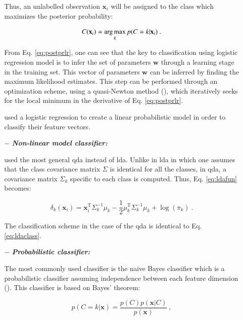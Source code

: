 \begin{enumerate}[leftmargin=*]
Thus, an unlabelled observation $\mathbf{x}_i$ will be assigned to the class which maximizes the posterior probability:

\begin{equation}
	C(\mathbf{x}_i) = \operatorname*{arg\,max}_k p(C=k|\mathbf{x}_i) \ .
	\label{eq:posprobreg}
\end{equation}

From Eq. \eqref{eq:postprlr}, one can see that the key to classification using logistic regression model is to infer the set of parameters $\mathbf{w}$ through a learning stage in the training set. This vector of parameters $\mathbf{w}$ can be inferred by finding the maximum likelihood estimates. This step can be performed through an optimization scheme, using a quasi-Newton method (\cite{Byrd1995}), which iteratively seeks for the local minimum in the derivative of Eq. \eqref{eq:postprlr}.

\cite{Kelm2007,Puech2009} used a logistic regression to create a linear probabilistic model in order to classify their feature vectors.

\item[$-$] \textbf{\textit{Non-linear model classifier:}} 

\cite{Viswanath2012} used the most general \acf{qda} instead of \ac{lda}. Unlike in \ac{lda} in which one assumes that the class covariance matrix $\Sigma$ is identical for all the classes, in \ac{qda}, a covariance matrix $\Sigma_k$ specific to each class is computed. Thus, Eq. \eqref{eq:ldafun} becomes:

\begin{equation}
	\delta_{k}(\mathbf{x}_i) = \mathbf{x}_i^{\text{T}} \Sigma_{k}^{-1} \mu_k - \frac{1}{2} \mu_{k}^{\text{T}} \Sigma_{k}^{-1} \mu_k + \log (\pi_k) \ .
	\label{eq:qdafun}
\end{equation}

The classification scheme in the case of the \ac{qda} is identical to Eq. \eqref{eq:ldaclass}.

\item[$-$] \textbf{\textit{Probabilistic classifier:}}

The most commonly used classifier is the naive Bayes classifier which is a probabilistic classifier assuming independence between each feature dimension (\cite{Rish2001}). This classifier is based on Bayes' theorem:

\begin{equation}
	p(C=k|\mathbf{x}) = \frac{p(C)p(\mathbf{x}|C)}{p(\mathbf{x})} \ ,
	\label{eq:bayth}
\end{equation}


\end{enumerate}
